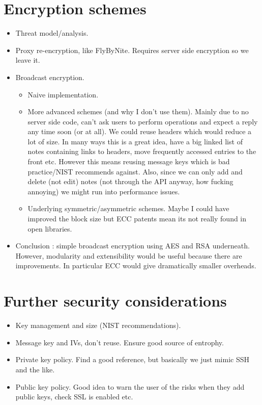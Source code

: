 \section{Encryption schemes}
    \begin{itemize}
        \item Threat model/analysis.
        \item Proxy re-encryption, like FlyByNite. Requires server side encryption so we leave it.
        \item Broadcast encryption.
        \begin{itemize}
            \item Naive implementation.
            \item More advanced schemes (and why I don't use them). Mainly due to no server side code, can't ask users to perform operations and expect a reply any time soon (or at all). We could reuse headers which would reduce a lot of size. In many ways this is a great idea, have a big linked list of notes containing links to headers, move frequently accessed entries to the front etc. However this means reusing message keys which is bad practice/NIST recommends against. Also, since we can only add and delete (not edit) notes (not through the API anyway, how fucking annoying) we might run into performance issues. 
            \item Underlying symmetric/asymmetric schemes. Maybe I could have improved the block size but ECC patents mean its not really found in open libraries.
        \end{itemize}
	
        \item Conclusion : simple broadcast encryption using AES and RSA underneath. However, modularity and extensibility would be useful because there are improvements. In particular ECC would give dramatically smaller overheads. 
    \end{itemize}
    
\section{Further security considerations}

\begin{itemize}
    \item Key management and size (NIST recommendations).
    \item Message key and IVs, don't reuse. Ensure good source of entrophy.
    \item Private key policy. Find a good reference, but basically we just mimic SSH and the like.
    \item Public key policy. Good idea to warn the user of the risks when they add public keys, check SSL is enabled etc.
\end{itemize}


